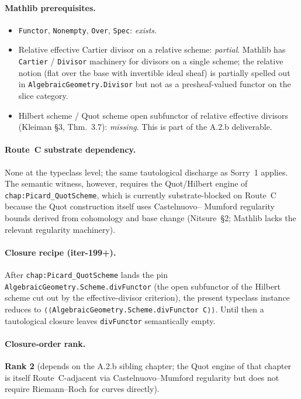 \paragraph{Mathlib prerequisites.}
\begin{itemize}
  \item \texttt{Functor}, \texttt{Nonempty}, \texttt{Over},
    \texttt{Spec}: \emph{exists}.
  \item Relative effective Cartier divisor on a relative scheme:
    \emph{partial}. Mathlib has \texttt{Cartier} / \texttt{Divisor}
    machinery for divisors on a single scheme; the relative notion
    (flat over the base with invertible ideal sheaf) is partially
    spelled out in \texttt{AlgebraicGeometry.Divisor} but not as a
    presheaf-valued functor on the slice category.
  \item Hilbert scheme / Quot scheme open subfunctor of relative
    effective divisors (Kleiman \S3, Thm.~3.7):
    \emph{missing}. This is part of the A.2.b deliverable.
\end{itemize}

\paragraph{Route~C substrate dependency.} None at the typeclass
level; the same tautological discharge as Sorry~1 applies. The
semantic witness, however, requires the Quot/Hilbert engine of
\texttt{chap:Picard_QuotScheme}, which is currently substrate-blocked
on Route~C because the Quot construction itself uses Castelnuovo--
Mumford regularity bounds derived from cohomology and base change
(Nitsure~\S2; Mathlib lacks the relevant regularity machinery).

\paragraph{Closure recipe (iter-199+).} After
\texttt{chap:Picard_QuotScheme} lands the pin
\texttt{AlgebraicGeometry.Scheme.divFunctor} (the open subfunctor of
the Hilbert scheme cut out by the effective-divisor criterion), the
present typeclass instance reduces to
\texttt{⟨⟨AlgebraicGeometry.Scheme.divFunctor C⟩⟩}. Until then a
tautological closure leaves \texttt{divFunctor} semantically empty.

\paragraph{Closure-order rank.} \textbf{Rank 2} (depends on the
A.2.b sibling chapter; the Quot engine of that chapter is itself
Route~C-adjacent via Castelnuovo--Mumford regularity but does not
require Riemann--Roch for curves directly).

